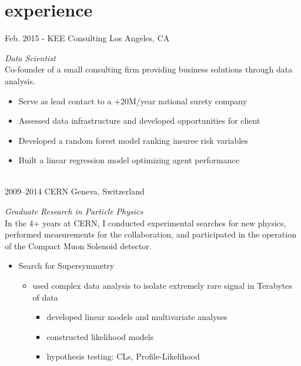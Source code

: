 \documentclass[]{friggeri-cv} %
\begin{document}
\section{experience}
\begin{entrylist}

\entry
{Feb. 2015 -}
{KEE Consulting}
{Los Angeles, CA}
{\emph{Data Scientist}\\
Co-founder of a small consulting firm providing 
business solutions through data analysis. 

\begin{itemize}
  \item Serve as lead contact to a +20M/year national surety company
  \item Assessed data infrastructure and developed opportunities for client
  \item Developed a random forest model ranking insuree risk variables
  \item Built a linear regression model optimizing agent performance 
\end{itemize}
}
~\\
\entry
{2009--2014}
{CERN}
{Geneva, Switzerland}
{\emph{Graduate Research in Particle Physics} \\
In the 4+ years at CERN, I conducted experimental searches for new physics, 
performed measurements for the collaboration, and participated in the operation 
of the Compact Muon Solenoid detector.
\begin{itemize}
\item Search for Supersymmetry
\begin{itemize}
\item used complex data analysis to isolate extremely rare signal in Terabytes of data
  \begin{itemize}
  \item developed linear models and multivariate analyses
  \item constructed likelihood models
  \item hypothesis testing: CLs, Profile-Likelihood

\end{itemize}
\end{itemize}
\end{itemize}}
\end{entrylist}
\end{document}
